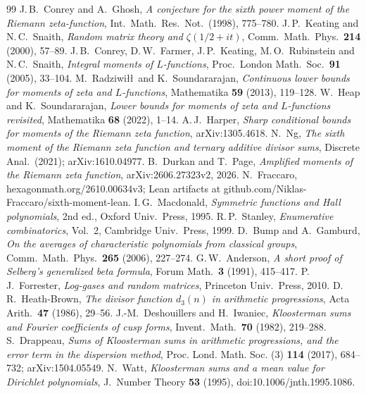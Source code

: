 \documentclass[11pt,colorlinks]{charlie}
\begin{document}
\begin{thebibliography}{99}\small
{} J.\,B.~Conrey and A.~Ghosh, \emph{A conjecture for the sixth power moment of the Riemann zeta-function}, Int.\ Math.\ Res.\ Not.\ (1998), 775--780.
 J.\,P.~Keating and N.\,C.~Snaith, \emph{Random matrix theory and $\zeta(1/2+it)$}, Comm.\ Math.\ Phys.\ \textbf{214} (2000), 57--89.
 J.\,B.~Conrey, D.\,W.~Farmer, J.\,P.~Keating, M.\,O.~Rubinstein and N.\,C.~Snaith, \emph{Integral moments of $L$-functions}, Proc.\ London Math.\ Soc.\ \textbf{91} (2005), 33--104.
 M.~Radziwi\l\l\ and K.~Soundararajan, \emph{Continuous lower bounds for moments of zeta and $L$-functions}, Mathematika \textbf{59} (2013), 119--128.
 W.~Heap and K.~Soundararajan, \emph{Lower bounds for moments of zeta and $L$-functions revisited}, Mathematika \textbf{68} (2022), 1--14.
 A.\,J.~Harper, \emph{Sharp conditional bounds for moments of the Riemann zeta function}, arXiv:1305.4618.
 N.~Ng, \emph{The sixth moment of the Riemann zeta function and ternary additive divisor sums}, Discrete Anal.\ (2021); arXiv:1610.04977.
 B.~Durkan and T.~Page, \emph{Amplified moments of the Riemann zeta function}, arXiv:2606.27323v2, 2026.
 N.~Fraccaro, hexagonmath.org/2610.00634v3; Lean artifacts at github.com/Niklas-Fraccaro/sixth-moment-lean.
 I.\,G.~Macdonald, \emph{Symmetric functions and Hall polynomials}, 2nd ed., Oxford Univ.\ Press, 1995.
 R.\,P.~Stanley, \emph{Enumerative combinatorics}, Vol.~2, Cambridge Univ.\ Press, 1999.
 D.~Bump and A.~Gamburd, \emph{On the averages of characteristic polynomials from classical groups}, Comm.\ Math.\ Phys.\ \textbf{265} (2006), 227--274.
 G.\,W.~Anderson, \emph{A short proof of Selberg's generalized beta formula}, Forum Math.\ \textbf{3} (1991), 415--417.
 P.\,J.~Forrester, \emph{Log-gases and random matrices}, Princeton Univ.\ Press, 2010.
 D.\,R.~Heath-Brown, \emph{The divisor function $d_3(n)$ in arithmetic progressions}, Acta Arith.\ \textbf{47} (1986), 29--56.
 J.-M.~Deshouillers and H.~Iwaniec, \emph{Kloosterman sums and Fourier coefficients of cusp forms}, Invent.\ Math.\ \textbf{70} (1982), 219--288.
 S.~Drappeau, \emph{Sums of Kloosterman sums in arithmetic progressions, and the error term in the dispersion method}, Proc. Lond. Math. Soc. (3) \textbf{114} (2017), 684--732; arXiv:1504.05549.
 N.~Watt, \emph{Kloosterman sums and a mean value for Dirichlet polynomials}, J.\ Number Theory \textbf{53} (1995), doi:10.1006/jnth.1995.1086.

\end{thebibliography}
\end{document}

